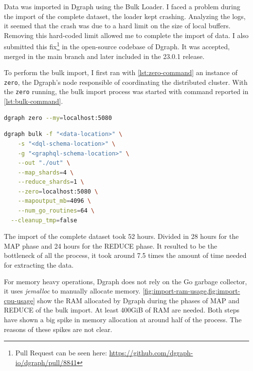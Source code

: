 Data was imported in Dgraph using the Bulk Loader. I faced a problem during the import of the complete dataset, the loader kept crashing. Analyzing the logs, it seemed that the crash was due to a hard limit on the size of local buffers. Removing this hard-coded limit allowed me to complete the import of data. I also submitted this fix\footnote{Pull Request can be seen here: \url{https://github.com/dgraph-io/dgraph/pull/8841}} in the open-source codebase of Dgraph. It was accepted, merged in the main branch and later included in the 23.0.1 release.

To perform the bulk import, I first ran with \cref{lst:zero-command} an instance of {\tt zero}, the Dgraph's node responsible of coordinating the distributed cluster. With the {\tt zero} running, the bulk import process was started with command reported in \cref{lst:bulk-command}.

\begin{lstlisting}[language=Bash,caption={Command used for running {\tt zero}.},label={lst:zero-command},captionpos=b,numbers=none]
    dgraph zero --my=localhost:5080
\end{lstlisting}

\begin{lstlisting}[language=Bash,caption={Command used for running {\tt bulk loader}.},label={lst:bulk-command},captionpos=b,numbers=none]
dgraph bulk -f "<data-location>" \
	-s "<dql-schema-location>" \
	-g "<graphql-schema-location>" \
	--out "./out" \
	--map_shards=4 \
	--reduce_shards=1 \
	--zero=localhost:5080 \
	--mapoutput_mb=4096 \
	--num_go_routines=64 \
  --cleanup_tmp=false
\end{lstlisting}

The import of the complete dataset took 52 hours. Divided in 28 hours for the MAP phase and 24 hours for the REDUCE phase. It resulted to be the bottleneck of all the process, it took around 7.5 times the amount of time needed for extracting the data. 

For memory heavy operations, Dgraph does not rely on the Go garbage collector, it uses \textit{jemalloc} to manually allocate memory. \cref{fig:import-ram-usage,fig:import-cpu-usage} show the RAM allocated by Dgraph during the phases of MAP and REDUCE of the bulk import. At least 400GiB of RAM are needed. Both steps have shown a big spike in memory allocation at around half of the process. The reasons of these spikes are not clear.

